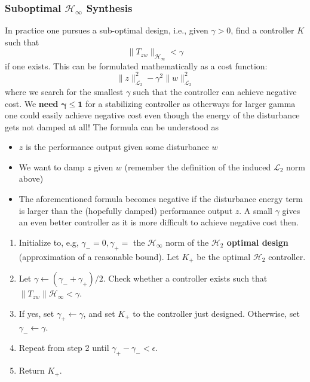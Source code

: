 \subsubsection{Suboptimal \texorpdfstring{$\mathcal{H}_\infty$}{H-infinity} Synthesis}
In practice one pursues a sub-optimal design, i.e., given $\gamma>0$, find a controller $K$ such that
\begin{equation*}
    \|T_{zw}\|_{\mathcal{H}_\infty}<\gamma
\end{equation*}
if one exists. This can be formulated mathematically as a cost function:
\begin{equation*}
    \|z\|_{\mathcal{L}_2}^2-\gamma^2\|w\|_{\mathcal{L}_2}^2
\end{equation*}
where we search for the smallest $\gamma$ such that the controller can achieve negative cost. We \textbf{need} $\boldsymbol{\gamma}\mathbf{\le1}$ for a stabilizing controller as otherways for larger gamma one could easily achieve negative cost even though the energy of the disturbance gets not damped at all! The formula can be understood as
\begin{itemize}
    \item $z$ is the performance output given some disturbance $w$
    \item We want to damp $z$ given $w$ (remember the definition of the induced $\mathcal{L}_2$ norm above)
    \item The aforementioned formula becomes negative if the disturbance energy term is larger than the (hopefully damped) performance output $z$. A small $\gamma$ gives an even better controller as it is more difficult to achieve negative cost then.
\end{itemize}


\begin{enumerate}
    \item Initialize to, e.g, $\gamma_-=0,\gamma_+=$ the $\mathcal{H}_\infty$ norm of the \textbf{$\mathcal{H}_2$ optimal design} (approximation of a reasonable bound). Let $K_+$ be the optimal $\mathcal{H}_2$ controller.
    \item Let $\gamma\leftarrow(\gamma_-+\gamma_+)/2$. Check whether a controller exists such that $\|T_{zw}\|\mathcal{H}_\infty<\gamma$.
    \item If yes, set $\gamma_+\leftarrow\gamma$, and set $K_+$ to the controller just designed. Otherwise, set $\gamma_-\leftarrow\gamma$.
    \item Repeat from step 2 until $\gamma_+-\gamma_-<\epsilon$.
    \item Return $K_+$.
\end{enumerate}

